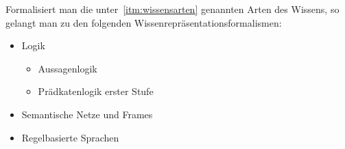 Formalisiert man die unter~\ref{itm:wissensarten} genannten Arten des Wissens, so gelangt man zu den folgenden Wissenrepräsentationsformalismen:
\begin{itemize}
    \item Logik
        \begin{itemize}
            \item Aussagenlogik
            \item Prädkatenlogik erster Stufe
        \end{itemize}
    \item Semantische Netze und Frames
    \item Regelbasierte Sprachen
\end{itemize}

